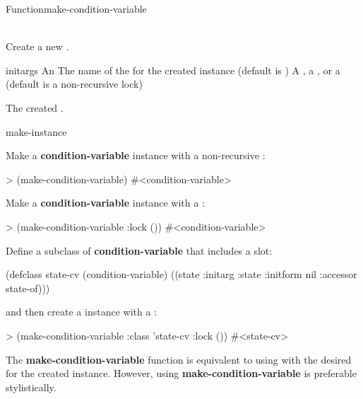 \begin{functiondoc}{Function}{make-condition-variable}%
  {  \\ 
     \\
   \returns{} }
%
%
%
 
\fnsyntax

\fnpurpose Create a new .

\fnpackage {}

\fnmodule {}

\fnargs
\begin{args}{initargs}
\arg[initargs] An 
\arg[class] The name of the  for the created
 instance (default is )
\arg[lock] A , a , or a 
 (default is a non-recursive lock)
\end{args}

\fnreturns
The created \textbf{}.

\begin{alsos}{make-instance}
\end{alsos}

\fnexamples
Make a \textbf{condition-variable} instance with a non-recursive 
:
%
\W\supp
\begin{example}
> (make-condition-variable)
#<condition-variable>
\end{example}
%
Make a \textbf{condition-variable} instance with a
:
%
\W\supp\notpretop
\begin{example}
> (make-condition-variable :lock ())
#<condition-variable>
\end{example}
%
Define a subclass of \textbf{condition-variable} that includes a 
 slot:
%
\W\supp\notpretop
\begin{example}
  (defclass state-cv (condition-variable)
    ((state :initarg :state
            :initform nil
            :accessor state-of)))
\end{example}
%
and then create a  instance with a :
%
\W\supp\notpretop
\begin{example}
> (make-condition-variable :class 'state-cv
                           :lock ())
#<state-cv>
\end{example}

\fnnote The \textbf{make-condition-variable} function is equivalent to using
\textbf{} with the desired  for the
created  instance.  However, using
\textbf{make-condition-variable} is preferable stylistically.

\end{functiondoc}

